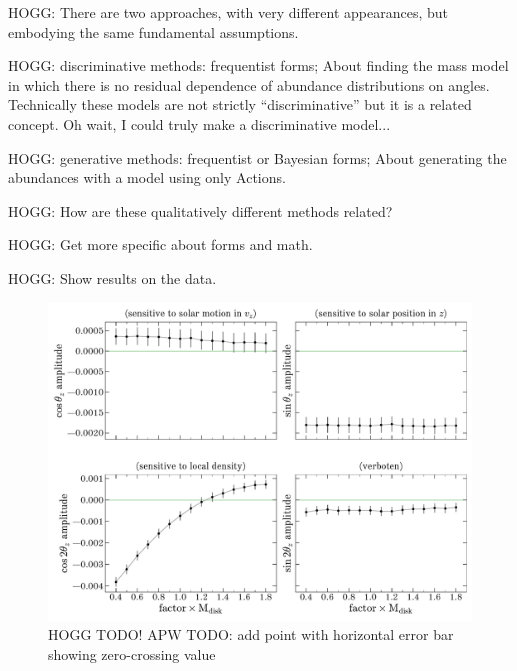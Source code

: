 \documentclass[modern]{aastex63}
\begin{document}
HOGG: There are two approaches, with very different appearances, but
embodying the same fundamental assumptions.

HOGG: discriminative methods: frequentist forms; About finding the mass model in which
there is no residual dependence of abundance distributions on angles.
Technically these models are not strictly ``discriminative'' but it is a related
concept. Oh wait, I could truly make a discriminative model...

HOGG: generative methods: frequentist or Bayesian forms; About generating the abundances
with a model using only Actions.

HOGG: How are these qualitatively different methods related?

HOGG: Get more specific about forms and math.

HOGG: Show results on the data.

\begin{figure}[!tp]
  \begin{center}
  \includegraphics[width=\textwidth]{coeff-vs-mdisk.pdf}
  \end{center}
  \caption{%
    HOGG TODO!
    APW TODO: add point with horizontal error bar showing zero-crossing value
  \label{fig:coeff-mdisk}
  }
\end{figure}
\end{document}
